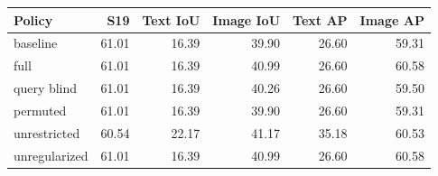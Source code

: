 \begin{tabular}{lrrrrr}
\toprule
Policy & S19 & Text IoU & Image IoU & Text AP & Image AP \\
\midrule
baseline & 61.01 & 16.39 & 39.90 & 26.60 & 59.31 \\
full & 61.01 & 16.39 & 40.99 & 26.60 & 60.58 \\
query blind & 61.01 & 16.39 & 40.26 & 26.60 & 59.50 \\
permuted & 61.01 & 16.39 & 39.90 & 26.60 & 59.31 \\
unrestricted & 60.54 & 22.17 & 41.17 & 35.18 & 60.53 \\
unregularized & 61.01 & 16.39 & 40.99 & 26.60 & 60.58 \\
\bottomrule
\end{tabular}
